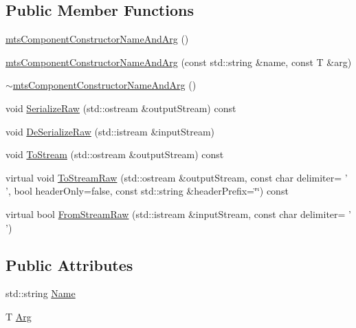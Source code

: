 \subsection*{Public Member Functions}
\begin{DoxyCompactItemize}
\item 
\hyperlink{classmts_component_constructor_name_and_arg_ac2dde2890f4500a118dfce57ecb3aa88}{mts\-Component\-Constructor\-Name\-And\-Arg} ()
\item 
\hyperlink{classmts_component_constructor_name_and_arg_a4b165f0adb89cda1e4534e3ce35a94e4}{mts\-Component\-Constructor\-Name\-And\-Arg} (const std\-::string \&name, const T \&arg)
\item 
\hyperlink{classmts_component_constructor_name_and_arg_acf809e1858750f22f7848226aace1b93}{$\sim$mts\-Component\-Constructor\-Name\-And\-Arg} ()
\item 
void \hyperlink{classmts_component_constructor_name_and_arg_a3531417cca046597939078ae0f60d84c}{Serialize\-Raw} (std\-::ostream \&output\-Stream) const 
\item 
void \hyperlink{classmts_component_constructor_name_and_arg_a3a81e128d43f1aefba3e92b545c50104}{De\-Serialize\-Raw} (std\-::istream \&input\-Stream)
\item 
void \hyperlink{classmts_component_constructor_name_and_arg_ac87df999cdaf708d9c6d07e6c9f9a1e8}{To\-Stream} (std\-::ostream \&output\-Stream) const 
\item 
virtual void \hyperlink{classmts_component_constructor_name_and_arg_a9fb0305f074d11a5473d56fc204c6e04}{To\-Stream\-Raw} (std\-::ostream \&output\-Stream, const char delimiter= ' ', bool header\-Only=false, const std\-::string \&header\-Prefix=\char`\"{}\char`\"{}) const 
\item 
virtual bool \hyperlink{classmts_component_constructor_name_and_arg_ab72fc2e2727e3dfb442cb2259937ebee}{From\-Stream\-Raw} (std\-::istream \&input\-Stream, const char delimiter= ' ')
\end{DoxyCompactItemize}
\subsection*{Public Attributes}
\begin{DoxyCompactItemize}
\item 
std\-::string \hyperlink{classmts_component_constructor_name_and_arg_ad9cb127f100da531c3aac4b949f7aa73}{Name}
\item 
T \hyperlink{classmts_component_constructor_name_and_arg_ac44dbfc39967fa6841d24e575c8ea1fb}{Arg}
\end{DoxyCompactItemize}


